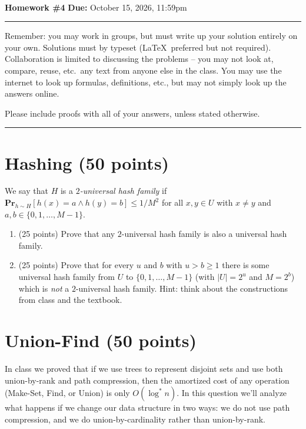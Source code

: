 \documentclass[11pt]{article}
\begin{document}
\\ 
{{\bf Homework \#4}} \hfill {{\bf Due:} October 15, 2026, 11:59pm} \\
\rule[0.1in]{\textwidth}{0.4pt}

Remember: you may work in groups, but must write up your solution entirely on your own.  Solutions must by typeset (\LaTeX\ preferred but not required).  Collaboration is limited to discussing the problems -- you may not look at, compare, reuse, etc.~any text from anyone else in the class.  You may use the internet to look up formulas, definitions, etc., but may not simply look up the answers online.  

Please include proofs with all of your answers, unless stated otherwise.

\noindent \rule[0.1in]{\textwidth}{0.4pt}

\section{Hashing (50 points)}

We say that $H$ is a \emph{$2$-universal hash family} if $\textbf{Pr}_{h \sim H}[h(x) = a \land h(y) = b] \leq 1/M^2$ for all $x,y \in U$ with $x \neq y$ and $a,b \in \{0,1,\dots,M-1\}$.  

\begin{enumerate}
\item (25 points)  Prove that any $2$-universal hash family is also a universal hash family. 

\item (25 points) Prove that for every $u$ and $b$ with $u > b \geq 1$ there is some universal hash family from $U$ to $\{0,1,\dots, M-1\}$ (with $|U| = 2^u$ and $M = 2^b$) which is \emph{not} a $2$-universal hash family.  Hint: think about the constructions from class and the textbook.

\end{enumerate}


\section{Union-Find (50 points)}

In class we proved that if we use trees to represent disjoint sets and use both union-by-rank and path compression, then the amortized cost of any operation (Make-Set, Find, or Union) is only $O(\log^* n)$.  In this question we'll analyze what happens if we change our data structure in two ways: we do not use path compression, and we do union-by-cardinality rather than union-by-rank.
\end{document}
